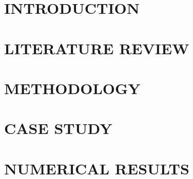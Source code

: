 \documentclass[a4paper,13pt,3p,twoside]{report}
\theoremstyle{definition}
\begin{document}
\renewcommand{\listtablename}{LIST OF TABLES}
{\let\oldnumberline\numberline
\renewcommand{\numberline}{Table~\oldnumberline}
\listoftables}

\glsaddall 
\renewcommand*{\acronymname}{LIST OF ABBREVIATIONS}
\renewcommand*{\entryname}{Abbreviation}
\renewcommand*{\descriptionname}{Definition}
\printnoidxglossaries

\renewcommand\appendixname{APPENDIX}
\renewcommand\appendixpagename{APPENDIX}
\renewcommand\appendixtocname{APPENDIX}

\renewcommand{\figurename}{Figure}
\renewcommand{\tablename}{Table}
\renewcommand{\chaptername}{CHAPTER}



\newpage
{}

\pagestyle{fancy}
\fancyhf{}
\fancyhead[RE, LO]{\leftmark}
\fancyfoot[RE, LO]{\thepage}

\chapter{INTRODUCTION}

\newpage
\chapter{LITERATURE REVIEW}



\newpage
\chapter{METHODOLOGY}


\newpage
\chapter{CASE STUDY}


\newpage
\chapter{NUMERICAL RESULTS}

\end{document}

